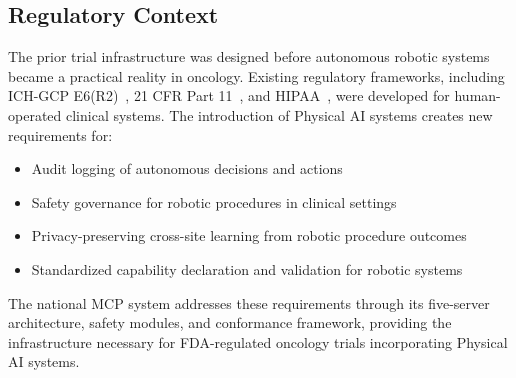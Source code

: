\documentclass{article}
\begin{document}
\subsection{Regulatory Context}

The prior trial infrastructure was designed before autonomous robotic systems became a practical reality in oncology. Existing regulatory frameworks, including ICH-GCP E6(R2)~\cite{ichgcp2016}, 21 CFR Part 11~\cite{fda2003part11}, and HIPAA~\cite{hipaa1996}, were developed for human-operated clinical systems. The introduction of Physical AI systems creates new requirements for:

\begin{itemize}[leftmargin=*]
\item Audit logging of autonomous decisions and actions
\item Safety governance for robotic procedures in clinical settings
\item Privacy-preserving cross-site learning from robotic procedure outcomes
\item Standardized capability declaration and validation for robotic systems
\end{itemize}

The national MCP system addresses these requirements through its five-server architecture, safety modules, and conformance framework, providing the infrastructure necessary for FDA-regulated oncology trials incorporating Physical AI systems.

\end{document}
